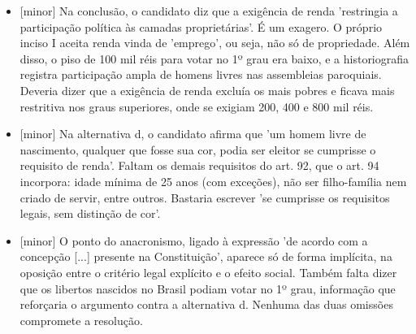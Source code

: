 \documentclass{article}%
\begin{document}
\begin{itemize}%
\item%
{[}minor{]} Na conclusão, o candidato diz que a exigência de renda 'restringia a participação política às camadas proprietárias'. É um exagero. O próprio inciso I aceita renda vinda de 'emprego', ou seja, não só de propriedade. Além disso, o piso de 100 mil réis para votar no 1º grau era baixo, e a historiografia registra participação ampla de homens livres nas assembleias paroquiais. Deveria dizer que a exigência de renda excluía os mais pobres e ficava mais restritiva nos graus superiores, onde se exigiam 200, 400 e 800 mil réis.%
\item%
{[}minor{]} Na alternativa d, o candidato afirma que 'um homem livre de nascimento, qualquer que fosse sua cor, podia ser eleitor se cumprisse o requisito de renda'. Faltam os demais requisitos do art. 92, que o art. 94 incorpora: idade mínima de 25 anos (com exceções), não ser filho{-}família nem criado de servir, entre outros. Bastaria escrever 'se cumprisse os requisitos legais, sem distinção de cor'.%
\item%
{[}minor{]} O ponto do anacronismo, ligado à expressão 'de acordo com a concepção {[}...{]} presente na Constituição', aparece só de forma implícita, na oposição entre o critério legal explícito e o efeito social. Também falta dizer que os libertos nascidos no Brasil podiam votar no 1º grau, informação que reforçaria o argumento contra a alternativa d. Nenhuma das duas omissões compromete a resolução.%
\end{itemize}%
\end{document}
